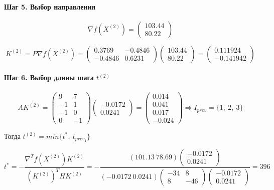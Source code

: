 \paragraph{Шаг 5. Выбор направления}

\begin{equation*} 
	\nabla f(X^{(2)}) = \begin{pmatrix} 
		103.44
		\\ 
		80.22
	\end{pmatrix}
\end{equation*}

\begin{equation*}
	K^{(2)} = P \nabla f(X^{(2)}) = \begin{pmatrix} 
		0.3769 & -0.4846 
		\\ 
		-0.4846  & 0.6231 
	\end{pmatrix}
	\begin{pmatrix} 
		103.44
		\\ 
		80.22
	\end{pmatrix}
	=
	\begin{pmatrix} 
		0.111924 \\-0.141942
	\end{pmatrix}
\end{equation*}

\paragraph{Шаг 6. Выбор длины шага $t^{(2)}$}

\begin{equation*}
	A K^{(2)} = \begin{pmatrix}
		9 & 7
		\\
		-1 & 1
		\\
		-1 & 0
		\\
		0 & -1
	\end{pmatrix}
	\begin{pmatrix} 
		-0.0172
		\\ 
		0.0241
	\end{pmatrix}
	=
	\begin{pmatrix}
		0.014 \\ 0.041 \\ 0.017\\ -0.024
	\end{pmatrix}
	\Rightarrow I_{prev} = \{1,\ 2,\ 3\}
\end{equation*}

Тогда $t^{(2)} = min\{t^*,\ t_{prev_1}\}$

\begin{equation*}
	t^* = -\frac{\nabla^T f(X^{(2)}) K^{(2)}}{(K^{(2)})^T H K^{(2)}} = -\frac{(101.13\  78.69) \begin{pmatrix} -0.0172 \\ 0.0241 \end{pmatrix}}{(-0.0172\ 0.0241) \begin{pmatrix} -34 & 8 \\ 8 & -46 \end{pmatrix} \begin{pmatrix} -0.0172 \\ 0.0241 \end{pmatrix}} = 396
\end{equation*}

